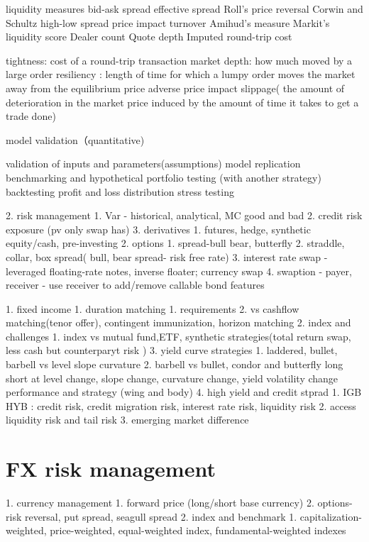 \documentclass[11pt, openany]{book}              %
\begin{document}
liquidity measures
bid-ask spread
effective spread
Roll’s price reversal 
Corwin and Schultz high-low spread 
price impact
turnover
Amihud’s measure
Markit’s liquidity score
Dealer count
Quote depth
Imputed round-trip cost






tightness: cost of a round-trip transaction
market depth: how much moved by a large order
resiliency : length of time for which a lumpy order moves the market away from the equilibrium price
adverse price impact
slippage( the amount of deterioration in the market price induced by the amount of time it takes to get a trade done)  


model validation（quantitative)

validation of inputs and parameters(assumptions)
model replication
benchmarking and hypothetical portfolio testing (with another strategy)
backtesting
profit and loss distribution
stress testing\

2. risk management
    1. Var - historical, analytical, MC good and bad
    2. credit risk exposure (pv only swap has)
3. derivatives  
    1. futures, hedge, synthetic equity/cash, pre-investing
    2. options
        1. spread-bull bear, butterfly   
        2. straddle, collar, box spread( bull, bear spread- risk free rate)
        3. interest rate swap - leveraged floating-rate notes, inverse floater; currency swap
        4. swaption - payer, receiver - use receiver to add/remove callable bond features 


1. fixed income
    1. duration matching 
        1. requirements
        2. vs cashflow matching(tenor offer), contingent immunization, horizon matching
    2. index and challenges 
        1. index vs mutual fund,ETF, synthetic strategies(total return swap, less cash but counterparyt risk )
    3. yield curve strategies
        1. laddered, bullet, barbell vs level slope curvature
        2. barbell vs bullet, condor and butterfly long short at level change, slope change, curvature change, yield volatility change performance and strategy (wing and body)
    4. high yield and credit stprad
        1. IGB HYB : credit risk, credit migration risk, interest rate risk, liquidity risk
        2. access liquidity risk and tail risk 
        3. emerging market difference 


\section{FX risk management}
    1. currency management 
        1. forward price (long/short base currency) 
        2. options- risk reversal, put spread, seagull spread
    2. index and benchmark
        1. capitalization-weighted, price-weighted, equal-weighted index, fundamental-weighted indexes 
\end{document}

